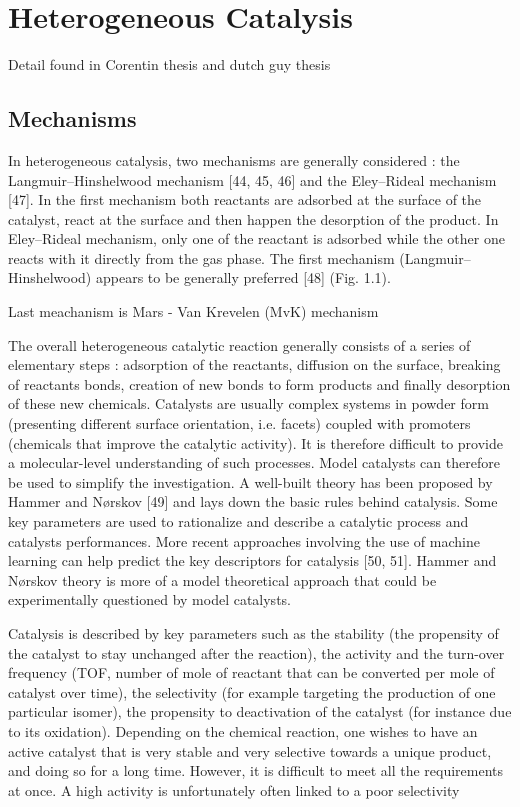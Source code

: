 \section{Heterogeneous Catalysis}

Detail found in Corentin thesis and dutch guy thesis

\subsection{Mechanisms}

In heterogeneous catalysis, two mechanisms are generally considered : the Langmuir–Hinshelwood mechanism [44, 45, 46] and the Eley–Rideal mechanism [47]. In the first mechanism both reactants are adsorbed at the surface of the catalyst, react at the surface and then happen the desorption of the product. In Eley–Rideal mechanism, only one of the reactant is adsorbed while the other one reacts with it directly from the gas phase. The first mechanism (Langmuir–Hinshelwood) appears to be generally preferred [48] (Fig. 1.1).

Last meachanism is Mars - Van Krevelen (MvK) mechanism

The overall heterogeneous catalytic reaction generally consists of a series of elementary
steps : adsorption of the reactants, diffusion on the surface, breaking of reactants bonds, creation of new bonds to form products and finally desorption of these new chemicals. Catalysts are usually complex systems in powder form (presenting different surface orientation, i.e. facets) coupled with promoters (chemicals that improve the catalytic activity). It is therefore difficult to provide a molecular-level understanding of such processes. Model catalysts can therefore be used to simplify the investigation. A well-built theory has been proposed by Hammer and Nørskov [49] and lays down the basic rules behind catalysis. Some key parameters are used to rationalize and describe a catalytic process and catalysts performances. More recent approaches involving the use of machine learning can help predict the key descriptors for catalysis [50, 51]. Hammer and Nørskov theory is more of a model theoretical approach that could be experimentally questioned by model catalysts.

Catalysis is described by key parameters such as the stability (the propensity of the catalyst to stay unchanged after the reaction), the activity and the turn-over frequency (TOF, number of mole of reactant that can be converted per mole of catalyst over time), the selectivity (for example targeting the production of one particular isomer), the propensity to deactivation of the catalyst (for instance due to its oxidation). Depending on the chemical reaction, one wishes to have an active catalyst that is very stable and very selective towards a unique product, and doing so for a long time. However, it is difficult to meet all the requirements at once. A high activity is unfortunately often linked to a poor selectivity

